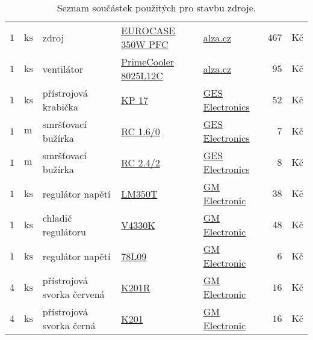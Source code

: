 \begin{table}[h]
	\centering
	\caption{Seznam součástek použitých pro stavbu zdroje.}
	\label{tab:SeznamSoucastek:Zdroj}
	\begin{tabular}[t]{|r@{$\,$}l|p{4.6cm}|p{4.2cm}|p{3.1cm}|r@{$\,$}l|}
		\hline
		$ 1 $ & $\mathrm{ks} $ & zdroj 													&	\href{http://www.alza.cz/zdroj-eurocase-350w-i-d44296.htm}{EUROCASE 350W PFC}											&	\href{http://www.alza.cz}{alza.cz}													&	$ 467 $ & $\textrm{Kč} $	\\
		$ 1 $ & $\mathrm{ks} $ & ventilátor 												&	\href{http://www.alza.cz/ventilator-primecooler-pc-8025l12c-d53092.htm}{PrimeCooler 8025L12C}			&	\href{http://www.alza.cz}{alza.cz}													&	$ 95 $ & $\textrm{Kč} $	\\
		$ 1 $ & $\mathrm{ks} $ & přístrojová krabička								&	\href{http://www.ges.cz/-kp-17-ges07203821.html}{KP 17}																							&	\href{http://www.ges.cz}{GES Electronics}									&	$ 52 $ & $\textrm{Kč} $	\\
		$ 1 $ & $\mathrm{m} $ & smršťovací bužírka							&	\href{http://www.ges.cz/-rc-160-ges06900482.html}{RC 1.6/0}																							&	\href{http://www.ges.cz}{GES Electronics}									&	$ 7 $ & $\textrm{Kč} $	\\
		$ 1 $ & $\mathrm{m} $ & smršťovací bužírka							&	\href{http://www.ges.cz/-rc-242-ges06900542.html}{RC 2.4/2}																							&	\href{http://www.ges.cz}{GES Electronics}									&	$ 8 $ & $\textrm{Kč} $	\\
		$ 1 $ & $\mathrm{ks} $ & regulátor napětí 								&	\href{http://www.gme.cz/cz/lm350t-p331-007.html}{LM350T}																						&	\href{http://www.gme.cz}{GM Electronic}										&	$ 38 $ & $\textrm{Kč} $	\\	
		$ 1 $ & $\mathrm{ks} $ & chladič regulátoru 								&	\href{http://www.gme.cz/cz/v4330k-p620-018.html}{V4330K}																						&	\href{http://www.gme.cz}{GM Electronic}										&	$ 48 $ & $\textrm{Kč} $	\\	
		$ 1 $ & $\mathrm{ks} $ & regulátor napětí 								&	\href{http://www.gme.cz/cz/-p330-014.html}{78L09}																										&	\href{http://www.gme.cz}{GM Electronic}										&	$ 6 $ & $\textrm{Kč} $	\\	
		$ 4 $ & $\mathrm{ks} $ & přístrojová svorka červená 				&	\href{http://www.gme.cz/cz/k201r-p808-038.html}{K201R}																								&	\href{http://www.gme.cz}{GM Electronic}										&	$ 16 $ & $\textrm{Kč} $	\\
		$ 4 $ & $\mathrm{ks} $ & přístrojová svorka černá 				&	\href{http://www.gme.cz/cz/k201-p808-003.html}{K201}																									&	\href{http://www.gme.cz}{GM Electronic}										&	$ 16 $ & $\textrm{Kč} $	\\	

\end{tabular}
\end{table}
